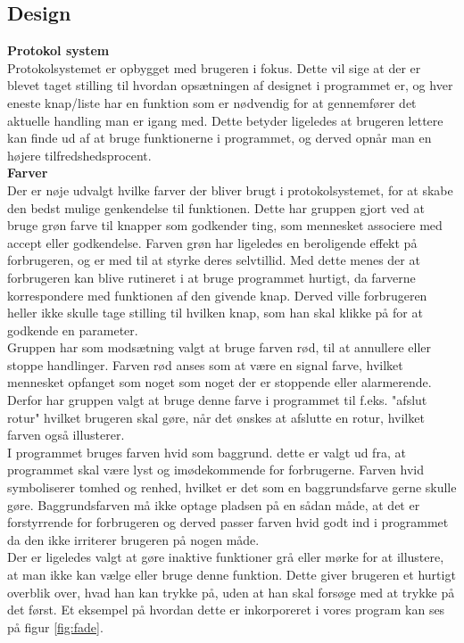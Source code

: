 \subsection{Design}
\label{sec:imple_design}

\textbf{Protokol system}\\
Protokolsystemet er opbygget med brugeren i fokus. Dette vil sige at der er blevet taget stilling til hvordan opsætningen af designet i programmet er, og hver eneste knap/liste har en funktion som er nødvendig for at gennemfører det aktuelle handling man er igang med. Dette betyder ligeledes at brugeren lettere kan finde ud af at bruge funktionerne i programmet, og derved opnår man en højere tilfredshedsprocent.\\

\textbf{Farver}\\
Der er nøje udvalgt hvilke farver der bliver brugt i protokolsystemet, for at skabe den bedst mulige genkendelse til funktionen. Dette har gruppen gjort ved at bruge grøn farve til knapper som godkender ting, som mennesket associere med accept eller godkendelse. Farven grøn har ligeledes en beroligende effekt på forbrugeren, og er med til at styrke deres selvtillid. Med dette menes der at forbrugeren kan blive rutineret i at bruge programmet hurtigt, da farverne korrespondere med funktionen af den givende knap. Derved ville forbrugeren heller ikke skulle tage stilling til hvilken knap, som han skal klikke på for at godkende en parameter.\\
Gruppen har som modsætning valgt at bruge farven rød, til at annullere eller stoppe handlinger. Farven rød anses som at være en signal farve, hvilket mennesket opfanget som noget som noget der er stoppende eller alarmerende. Derfor har gruppen valgt at bruge denne farve i programmet til f.eks. "afslut rotur" hvilket brugeren skal gøre, når det ønskes at afslutte en rotur, hvilket farven også illusterer.\\
I programmet bruges farven hvid som baggrund. dette er valgt ud fra, at programmet skal være lyst og imødekommende for forbrugerne. Farven hvid symboliserer tomhed og renhed, hvilket er det som en baggrundsfarve gerne skulle gøre. Baggrundsfarven må ikke optage pladsen på en sådan måde, at det er forstyrrende for forbrugeren og derved passer farven hvid godt ind i programmet da den ikke irriterer brugeren på nogen måde.\\
Der er ligeledes valgt at gøre inaktive funktioner grå eller mørke for at illustere, at man ikke kan vælge eller bruge denne funktion. Dette giver brugeren et hurtigt overblik over, hvad han kan trykke på, uden at han skal forsøge med at trykke på det først. Et eksempel på hvordan dette er inkorporeret i vores program kan ses på figur \ref{fig:fade}.

